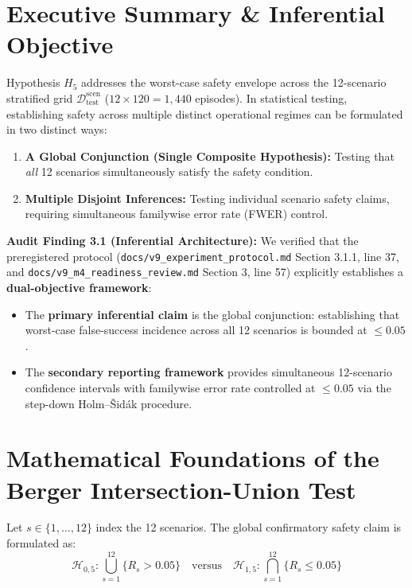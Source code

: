 \documentclass[10pt,a4paper]{article}
\begin{document}
\section{Executive Summary \& Inferential Objective}
Hypothesis $H_5$ addresses the worst-case safety envelope across the 12-scenario stratified grid $\mathcal{D}_{\mathrm{test}}^{\mathrm{scen}}$ ($12 \times 120 = 1,440$ episodes). In statistical testing, establishing safety across multiple distinct operational regimes can be formulated in two distinct ways:
\begin{enumerate}
    \item \textbf{A Global Conjunction (Single Composite Hypothesis):} Testing that \textit{all} 12 scenarios simultaneously satisfy the safety condition.
    \item \textbf{Multiple Disjoint Inferences:} Testing individual scenario safety claims, requiring simultaneous familywise error rate (FWER) control.
\end{enumerate}

\noindent \textbf{Audit Finding 3.1 (Inferential Architecture):}  
We verified that the preregistered protocol (\texttt{docs/v9\_experiment\_protocol.md} Section 3.1.1, line 37, and \texttt{docs/v9\_m4\_readiness\_review.md} Section 3, line 57) explicitly establishes a \textbf{dual-objective framework}:
\begin{itemize}
    \item The \textbf{primary inferential claim} is the global conjunction: establishing that worst-case false-success incidence across all 12 scenarios is bounded at $\le 0.05$.
    \item The \textbf{secondary reporting framework} provides simultaneous 12-scenario confidence intervals with familywise error rate controlled at $\le 0.05$ via the step-down Holm--Šidák procedure.
\end{itemize}

\section{Mathematical Foundations of the Berger Intersection-Union Test}
Let $s \in \{1, \dots, 12\}$ index the 12 scenarios. The global confirmatory safety claim is formulated as:
\begin{equation}
\mathcal{H}_{0,5}: \bigcup_{s=1}^{12} \{R_s > 0.05\} \quad\text{versus}\quad \mathcal{H}_{1,5}: \bigcap_{s=1}^{12} \{R_s \le 0.05\}
\end{equation}
\end{document}
